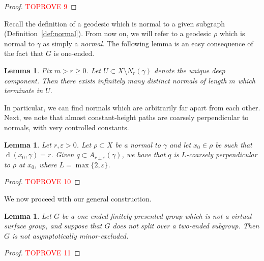 \documentclass[10pt,a4paper]{amsart}
\DeclareMathOperator{\dist}{d}
\newtheorem{lemma}[theorem]{Lemma}
\theoremstyle{definition}
\begin{document}
\begin{proof}\textcolor{red}{TOPROVE 9}\end{proof}



Recall the definition of a geodesic which is normal to a given subgraph (Definition~\ref{def:normal}). From now on, we will refer to a geodesic $\rho$ which is normal to $\gamma$ as simply a \textit{normal}. 
The following lemma is an easy consequence of the fact that $G$ is one-ended. 


\begin{lemma}\label{lem:normals-exist}
    Fix $m > r \geq 0$.  
    Let $U \subset X \setminus N_r(\gamma)$ denote the unique deep component. Then there exists infinitely many distinct normals of length $m$ which terminate in $U$. 
\end{lemma}


In particular, we can find normals which are arbitrarily far apart from each other. 
Next, we note that almost constant-height paths are coarsely perpendicular to normals, with very controlled constants. 


\begin{lemma}\label{lem:constant-height-coarse-perp}
    Let $r, \varepsilon > 0$. Let $\rho \subset X$ be a normal to $\gamma$ and let $x_0 \in \rho$ be such that $\dist(x_0, \gamma) = r$. Given $q \subset A_{r\pm \varepsilon}(\gamma)$, we have that $q$ is $L$-coarsely perpendicular to $\rho$ at $x_0$, where $L = \max\{2,\varepsilon\}$. 
\end{lemma}

\begin{proof}\textcolor{red}{TOPROVE 10}\end{proof}


We now proceed with our general construction. 


\begin{lemma}\label{lem:no-split}
    Let $G$ be a one-ended finitely presented group which is not a virtual surface group, and suppose that $G$ does not split over a two-ended subgroup. Then $G$ is not asymptotically minor-excluded. 
\end{lemma}


\begin{proof}\textcolor{red}{TOPROVE 11}\end{proof}
\end{document}
